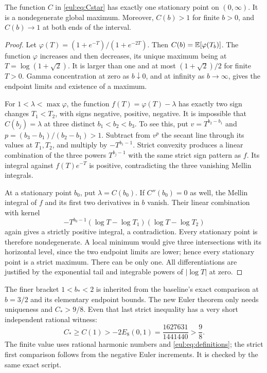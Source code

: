 \begin{proposition}\label{eul:prop:axis}
The function $C$ in \eqref{eul:eq:Cstar} has exactly one stationary
point on $(0,\infty)$. It is a nondegenerate global maximum. Moreover,
$C(b)>1$ for finite $b>0$, and $C(b)\to1$ at both ends of the interval.
\end{proposition}
\begin{proof}
Let $\varphi(T)=(1+e^{-T})/(1+e^{-2T})$. Then
$C(b)=\mathbb E[\varphi(T_b)]$. The function $\varphi$ increases and then
decreases, its unique maximum being at $T=\log(1+\sqrt2)$.
It is larger than one and at most $(1+\sqrt2)/2$ for finite $T>0$.
Gamma concentration at zero as $b\downarrow0$, and at infinity as
$b\to\infty$, gives the endpoint limits and existence of a maximum.

For $1<\lambda<\max\varphi$, the function
$f(T)=\varphi(T)-\lambda$ has exactly two sign changes $T_1<T_2$,
with signs negative, positive, negative. It is impossible that
$C(b_j)=\lambda$ at three distinct $b_1<b_2<b_3$. To see this, put
$v=T^{b_2-b_1}$ and $p=(b_3-b_1)/(b_2-b_1)>1$.
Subtract from $v^p$ the secant line through its values at $T_1,T_2$,
and multiply by $-T^{b_1-1}$. Strict convexity produces a linear
combination of the three powers $T^{b_j-1}$ with the same strict
sign pattern as $f$. Its integral against $f(T)e^{-T}$ is positive,
contradicting the three vanishing Mellin integrals.

At a stationary point $b_0$, put $\lambda=C(b_0)$. If $C''(b_0)=0$
as well, the Mellin integral of $f$ and its first two derivatives in
$b$ vanish. Their linear combination with kernel
\[
 -T^{b_0-1}(\log T-\log T_1)(\log T-\log T_2)
\]
again gives a strictly positive integral, a contradiction. Every
stationary point is therefore nondegenerate. A local minimum would
give three intersections with its horizontal level, since the two
endpoint limits are lower; hence every stationary point is a strict
maximum. There can be only one. All differentiations are justified
by the exponential tail and integrable powers of $|\log T|$ at zero.
\end{proof}

The finer bracket $1<b_*<2$ is inherited from the baseline's exact
comparison at $b=3/2$ and its elementary endpoint bounds. The new
Euler theorem only needs uniqueness and $C_*>9/8$. Even that last
strict inequality has a very short independent rational witness:
\begin{equation}\label{eul:eq:C-lower}
 C_*\ge C(1)>-2E_8(0,1)
 =\frac{1627631}{1441440}>\frac98.
\end{equation}
The finite value uses rational harmonic numbers and
\eqref{eul:eq:definitions}; the strict first comparison follows from
the negative Euler increments. It is checked by the same exact script.

